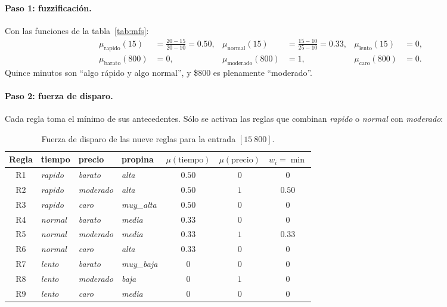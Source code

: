 \documentclass[11pt,letterpaper]{article}
\newcommand{\mf}[1]{\textit{#1}}
\begin{document}
\paragraph{Paso 1: fuzzificación.} Con las funciones de la tabla~\ref{tab:mfs}:
\begin{align*}
\mu_{\text{rapido}}(15) &= \frac{20 - 15}{20 - 10} = 0.50, &
\mu_{\text{normal}}(15) &= \frac{15 - 10}{25 - 10} = 0.33, &
\mu_{\text{lento}}(15) &= 0, \\
\mu_{\text{barato}}(800) &= 0, &
\mu_{\text{moderado}}(800) &= 1, &
\mu_{\text{caro}}(800) &= 0.
\end{align*}
Quince minutos son ``algo rápido y algo normal'', y \$800 es plenamente ``moderado''.

\paragraph{Paso 2: fuerza de disparo.} Cada regla toma el mínimo de sus antecedentes. Sólo se activan las reglas que combinan \mf{rapido} o \mf{normal} con \mf{moderado}:

\begin{table}[H]
\centering
\small
\caption{Fuerza de disparo de las nueve reglas para la entrada $[15\ 800]$.}
\label{tab:disparo}
\begin{tabular}{clllccc}
\toprule
Regla & tiempo & precio & propina & $\mu(\text{tiempo})$ & $\mu(\text{precio})$ & $w_i = \min$ \\
\midrule
R1 & \mf{rapido} & \mf{barato} & \mf{alta} & $0.50$ & $0$ & $0$ \\
\rowcolor{azul!10} R2 & \mf{rapido} & \mf{moderado} & \mf{alta} & $0.50$ & $1$ & $\mathbf{0.50}$ \\
R3 & \mf{rapido} & \mf{caro} & \mf{muy\_alta} & $0.50$ & $0$ & $0$ \\
R4 & \mf{normal} & \mf{barato} & \mf{media} & $0.33$ & $0$ & $0$ \\
\rowcolor{azul!10} R5 & \mf{normal} & \mf{moderado} & \mf{media} & $0.33$ & $1$ & $\mathbf{0.33}$ \\
R6 & \mf{normal} & \mf{caro} & \mf{alta} & $0.33$ & $0$ & $0$ \\
R7 & \mf{lento} & \mf{barato} & \mf{muy\_baja} & $0$ & $0$ & $0$ \\
R8 & \mf{lento} & \mf{moderado} & \mf{baja} & $0$ & $1$ & $0$ \\
R9 & \mf{lento} & \mf{caro} & \mf{media} & $0$ & $0$ & $0$ \\
\bottomrule
\end{tabular}
\end{table}
\end{document}
